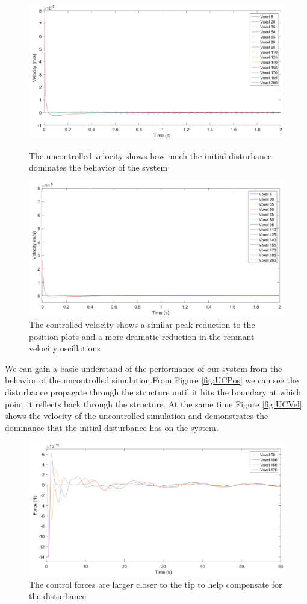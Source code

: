 \documentclass[11pt]{ucthesis}
\begin{document}
\begin{figure}[thpb]
\centering
\includegraphics[width=0.75\linewidth]{Figures/UncontrolledVelocity.png}
\caption{The uncontrolled velocity shows how much the initial disturbance dominates the behavior of the system}
\label{fig:UCVel}
\includegraphics[width=0.75\linewidth]{Figures/Velocity40Controlled12_10_2016.png}
\caption{The controlled velocity shows a similar peak reduction to the position plots and a more dramatic reduction in the remnant velocity oscillations}
\label{fig:CVel}
\end{figure}

We can gain a basic understand of the performance of our system from the behavior of the uncontrolled simulation.From Figure \ref{fig:UCPos} we can see the disturbance propagate through the structure until it hits the boundary at which point it reflects back through the structure. At the same time Figure \ref{fig:UCVel} shows the velocity of the uncontrolled simulation and demonstrates the dominance that the initial disturbance has on the system.

\begin{figure}[thpb]
\centering
\includegraphics[width=0.9\linewidth]{Figures/40ActiveVoxelControlForce-01.png}
\caption{The control forces are larger closer to the tip to help compensate for the disturbance}
\label{fig:control}
\end{figure}
\end{document}
